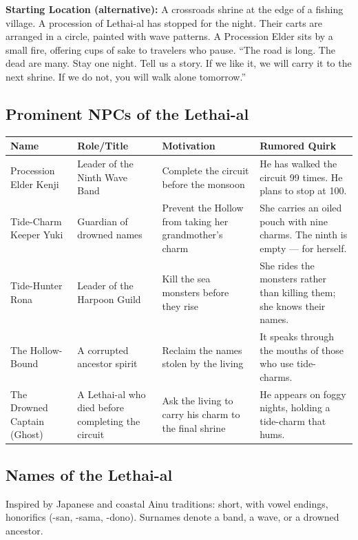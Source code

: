 \textbf{Starting Location (alternative):} A crossroads shrine at the edge of a fishing village. A procession of Lethai-al has stopped for the night. Their carts are arranged in a circle, painted with wave patterns. A Procession Elder sits by a small fire, offering cups of sake to travelers who pause. ``The road is long. The dead are many. Stay one night. Tell us a story. If we like it, we will carry it to the next shrine. If we do not, you will walk alone tomorrow.''

\subsection*{Prominent NPCs of the Lethai-al}
\label{sec:lethai-al-npcs}

\begin{longtable}{|p{}|p{}|p{}|p{}|}
\hline
\textbf{Name} & \textbf{Role/Title} & \textbf{Motivation} & \textbf{Rumored Quirk} \\
\hline
Procession Elder Kenji & Leader of the Ninth Wave Band & Complete the circuit before the monsoon & He has walked the circuit 99 times. He plans to stop at 100. \\
\hline
Tide-Charm Keeper Yuki & Guardian of drowned names & Prevent the Hollow from taking her grandmother's charm & She carries an oiled pouch with nine charms. The ninth is empty --- for herself. \\
\hline
Tide-Hunter Rona & Leader of the Harpoon Guild & Kill the sea monsters before they rise & She rides the monsters rather than killing them; she knows their names. \\
\hline
The Hollow-Bound & A corrupted ancestor spirit & Reclaim the names stolen by the living & It speaks through the mouths of those who use tide-charms. \\
\hline
The Drowned Captain (Ghost) & A Lethai-al who died before completing the circuit & Ask the living to carry his charm to the final shrine & He appears on foggy nights, holding a tide-charm that hums. \\
\hline
\end{longtable}

\subsection*{Names of the Lethai-al}
\label{sec:lethai-al-names}

Inspired by Japanese and coastal Ainu traditions: short, with vowel endings, honorifics (-san, -sama, -dono). Surnames denote a band, a wave, or a drowned ancestor.

